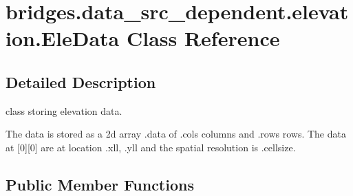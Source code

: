\hypertarget{classbridges_1_1data__src__dependent_1_1elevation_1_1_ele_data}{}\section{bridges.\+data\+\_\+src\+\_\+dependent.\+elevation.\+Ele\+Data Class Reference}
\label{classbridges_1_1data__src__dependent_1_1elevation_1_1_ele_data}


\subsection{Detailed Description}
class storing elevation data. 

The data is stored as a 2d array .data of .cols columns and .rows rows. The data at \mbox{[}0\mbox{]}\mbox{[}0\mbox{]} are at location .xll, .yll and the spatial resolution is .cellsize. \subsection*{Public Member Functions}
